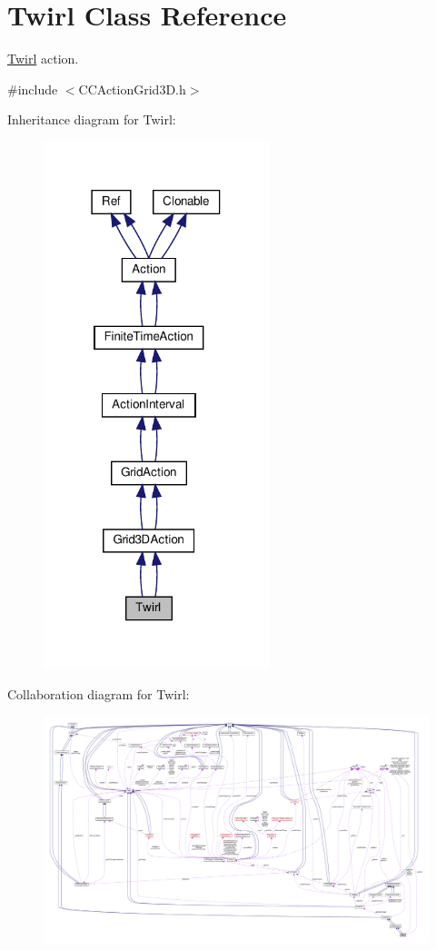 \hypertarget{classTwirl}{}\section{Twirl Class Reference}
\label{classTwirl}


\hyperlink{classTwirl}{Twirl} action.  




{\ttfamily \#include $<$C\+C\+Action\+Grid3\+D.\+h$>$}



Inheritance diagram for Twirl\+:
\nopagebreak
\begin{figure}[H]
\begin{center}
\leavevmode
\includegraphics[width=186pt]{classTwirl__inherit__graph}
\end{center}
\end{figure}


Collaboration diagram for Twirl\+:
\nopagebreak
\begin{figure}[H]
\begin{center}
\leavevmode
\includegraphics[width=350pt]{classTwirl__coll__graph}
\end{center}
\end{figure}
